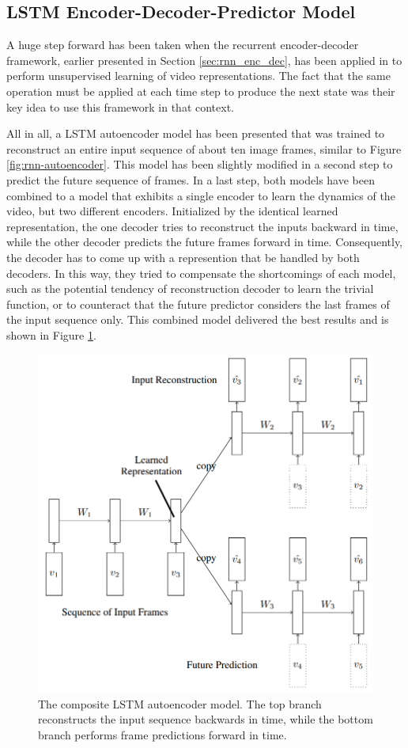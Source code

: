 \subsection{LSTM Encoder-Decoder-Predictor Model}

A huge step forward has been taken when the recurrent encoder-decoder framework, earlier presented in Section \ref{sec:rnn_enc_dec}, has been applied in \parencite{unsup_learn_lstm} to perform unsupervised learning of video representations. The fact that the same operation must be applied at each time step to produce the next state was their key idea to use this framework in that context. 

All in all, a LSTM autoencoder model has been presented that was trained to reconstruct an entire input sequence of about ten image frames, similar to Figure \ref{fig:rnn-autoencoder}. This model has been slightly modified in a second step to predict the future sequence of frames. In a last step, both models have been combined to a model that exhibits a single encoder to learn the dynamics of the video, but two different encoders. Initialized by the identical learned representation, the one decoder tries to reconstruct the inputs backward in time, while the other decoder predicts the future frames forward in time. Consequently, the decoder has to come up with a represention that be handled by both decoders. In this way, they tried to compensate the shortcomings of each model, such as the potential tendency of reconstruction decoder to learn the trivial function, or to counteract that the future predictor considers the last frames of the input sequence only. This combined model delivered the best results and is shown in Figure \ref{fig:lstm_combo}.

\begin{figure}[htb]
	\centering
	\includegraphics[width=0.5\linewidth]{figures/related/combo_shrinked.png} 
	\caption[Composite LSTM Autoencoder Model]{The composite LSTM autoencoder model. The top branch reconstructs the input sequence backwards in time, while the bottom branch performs frame predictions forward in time.} \label{fig:lstm_combo}
\end{figure}

